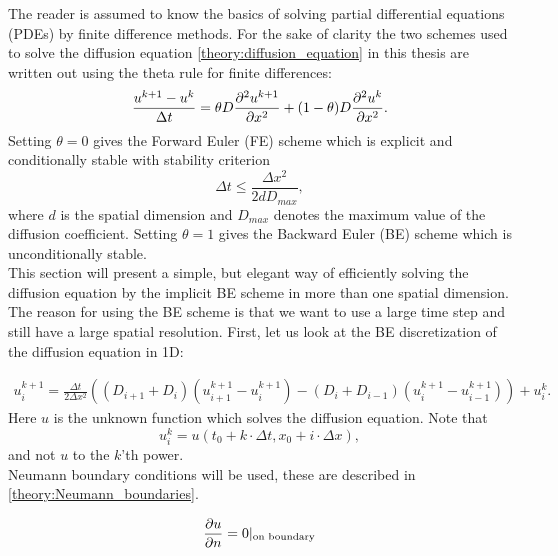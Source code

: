 The reader is assumed to know the basics of solving partial differential equations (PDEs) by finite difference methods. For the sake of clarity the two schemes used to solve the diffusion equation \eqref{theory:diffusion_equation} in this thesis are written out using the theta rule for finite differences: 
\begin{equation}\label{theory_theta_rule}
 \frac{u^{k+1}-u^k}{\Delta t} = \theta D\frac{\partial^2 u^{k+1}}{\partial x^2} + (1-\theta)D\frac{\partial^2 u^{k}}{\partial x^2}.
\end{equation}
\noindent Setting $\theta = 0$ gives the Forward Euler (FE) scheme which is explicit and conditionally stable with stability criterion 
\begin{equation}\label{theory:stability_FE}
 \Delta t \leq \frac{\Delta x^2}{2dD_{max}},
\end{equation}
where $d$ is the spatial dimension and $D_{max}$ denotes the maximum value of the diffusion coefficient.
Setting $\theta = 1$ gives the  Backward Euler (BE) scheme which is unconditionally stable. \\
This section will present a simple, but elegant way of efficiently solving the diffusion equation by the implicit BE scheme in more than one spatial dimension. The reason for using the BE scheme is that we want to use a large time step and still have a large spatial resolution. 
First, let us look at the BE discretization of the diffusion equation in 1D: 

\begin{align}\label{theory:BE_scheme_1D}
 u^{k+1}_i = \frac{\Delta t}{2\Delta x^2}\left((D_{i+1}+D_{i})(u^{k+1}_{i+1}-u^{k+1}_{i})-(D_{i}+D_{i-1})(u^{k+1}_{i}-u^{k+1}_{i-1})\right) + u^k_i.
\end{align}
Here $u$ is the unknown function which solves the diffusion equation. 
Note that 
$$u^k_i = u(t_0+k\cdot\Delta t,x_0+i\cdot\Delta x),$$
and not $u$ to the $k$'th power. \\
Neumann boundary conditions will be used, these are described in \eqref{theory:Neumann_boundaries}.

\begin{equation}\label{theory:Neumann_boundaries}
 \frac{\partial u}{\partial n} = 0|_{\text{on boundary}}
\end{equation}

